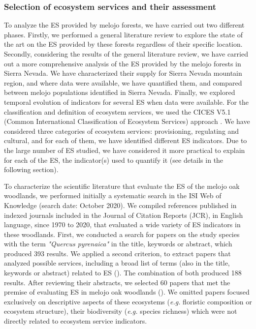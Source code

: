 \subsubsection{Selection of ecosystem services and their assessment }\label{sec:es:mat-selection}
To analyze the ES provided by melojo forests, we have carried out two different phases. Firstly, we performed a general literature review to explore the state of the art on the ES provided by these forests regardless of their specific location. Secondly, considering the results of the general literature review, we have carried out a more comprehensive analysis of the ES provided by the melojo forests in Sierra Nevada. We have characterized their supply for Sierra Nevada mountain region, and where data were available, we have quantified them, and compared between melojo populations identified in Sierra Nevada. Finally, we explored temporal evolution of indicators for several ES when data were available. For the classification and definition of ecosystem services, we used the CICES V5.1 (Common International Classification of Ecosystem Services) approach \autocites{HainesYoungPotschin2018CommonInternational}. We have considered three categories of ecosystem services: provisioning, regulating and cultural, and for each of them, we have identified different ES indicators. Due to the large number of ES studied, we have considered it more practical to explain for each of the ES, the indicator(s) used to quantify it (see details in the following section).  

To characterize the scientific literature that evaluate the ES of the melojo oak woodlands, we performed initially a systematic search in the ISI Web of Knowledge (search date: October 2020). We compiled references published in indexed journals included in the Journal of Citation Reports (JCR), in English language, since 1970 to 2020, that evaluated a wide variety of ES indicators in these woodlands. First, we conducted a search for papers on the study species with the term \emph{"Quercus pyrenaica"} in the title, keywords or abstract, which produced 393 results. We applied a second criterion, to extract papers that analyzed possible services, including a broad list of terms (also in the title, keywords or abstract) related to ES
(). The combination of both produced 188 results. After reviewing their abstracts, we selected 60 papers that met the premise of evaluating ES in melojo oak woodlands (). We omitted papers focused exclusively on descriptive aspects of these ecosystems (\emph{e.g.} floristic composition or ecosystem structure), their biodiversity (\emph{e.g.} species richness) which were not directly related to ecosystem service indicators. 

